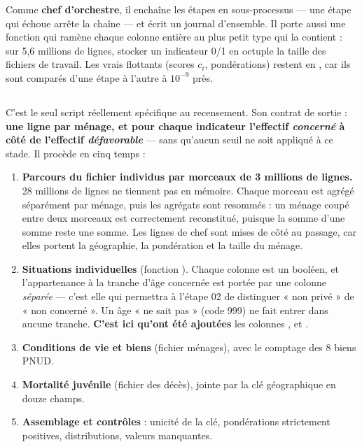 \documentclass[11pt,a4paper]{article}
\begin{document}
Comme \textbf{chef d'orchestre}, il enchaîne les étapes en sous-processus --- une étape qui
échoue arrête la chaîne --- et écrit un journal d'ensemble. Il porte aussi une fonction
 qui ramène chaque colonne entière au plus petit type qui la contient : sur 5,6
millions de lignes, stocker un indicateur 0/1 en  octuple la taille des fichiers de
travail. Les vrais flottants (scores $c_i$, pondérations) restent en , car ils sont
comparés d'une étape à l'autre à $10^{-9}$ près.

\subsection{}

C'est le seul script réellement spécifique au recensement. Son contrat de sortie : \textbf{une
ligne par ménage, et pour chaque indicateur l'effectif \emph{concerné} à côté de l'effectif
\emph{défavorable}} --- sans qu'aucun seuil ne soit appliqué à ce stade. Il procède en cinq
temps :

\begin{enumerate}
  \item \textbf{Parcours du fichier individus par morceaux de 3 millions de lignes.} 28 millions
  de lignes ne tiennent pas en mémoire. Chaque morceau est agrégé séparément par ménage, puis
  les agrégats sont resommés : un ménage coupé entre deux morceaux est correctement reconstitué,
  puisque la somme d'une somme reste une somme. Les lignes de chef sont mises de côté au passage,
  car elles portent la géographie, la pondération et la taille du ménage.

  \item \textbf{Situations individuelles} (fonction ). Chaque
  colonne est un booléen, et l'appartenance à la tranche d'âge concernée est portée par une
  colonne \emph{séparée} --- c'est elle qui permettra à l'étape 02 de distinguer « non privé »
  de « non concerné ». Un âge « ne sait pas » (code 999) ne fait entrer dans aucune tranche.
  \textbf{C'est ici qu'ont été ajoutées} les colonnes ,
   et .

  \item \textbf{Conditions de vie et biens} (fichier ménages), avec le comptage des 8 biens
  PNUD.

  \item \textbf{Mortalité juvénile} (fichier des décès), jointe par la clé géographique en douze
  champs.

  \item \textbf{Assemblage et contrôles} : unicité de la clé, pondérations strictement
  positives, distributions, valeurs manquantes.
\end{enumerate}
\end{document}
